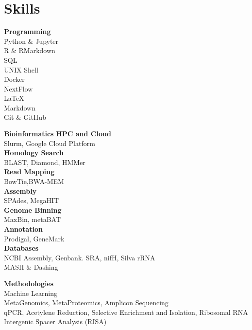 \documentclass[letterpaper]{twentysecondcv3} %
\begin{document}
\makeprofile %
 

\section{Skills}
\setlength\multicolsep{0pt}
\begin{multicols}{4}
\textbf{Programming}\\
Python \& Jupyter\\
R \& RMarkdown\\
SQL\\
UNIX Shell\\
Docker\\
NextFlow\\
\LaTeX\\
Markdown\\
Git \& GitHub
\columnbreak

\textbf{Bioinformatics}
\textbf{HPC and Cloud}\\
Slurm, Google Cloud Platform\\
\textbf{Homology Search}\\
BLAST, Diamond, HMMer\\
\textbf{Read Mapping}\\
BowTie,BWA-MEM\\
\textbf{Assembly}\\
SPAdes, MegaHIT\\
\textbf{Genome Binning}\\
MaxBin, metaBAT\\
\textbf{Annotation}\\
Prodigal, GeneMark\\
\textbf{Databases}\\
NCBI Assembly, Genbank. SRA, nifH, Silva rRNA\\
MASH \& Dashing
\columnbreak

\textbf{Methodologies}\\
Machine Learning\\
MetaGenomics, MetaProteomics, Amplicon Sequencing\\
qPCR, Acetylene Reduction, Selective Enrichment and Isolation, Ribosomal RNA Intergenic Spacer Analysis (RISA)

\end{multicols}
\end{document}
